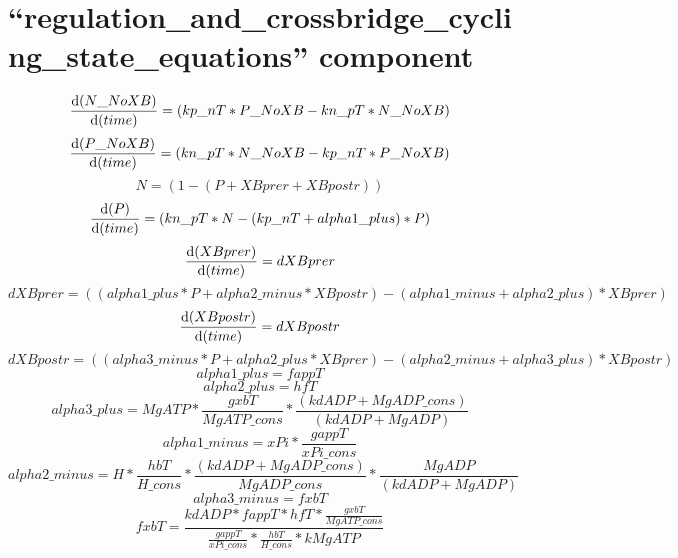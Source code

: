 \documentclass[10pt,landscape]{article}
\begin{document}
\section{``regulation\_and\_crossbridge\_cycling\_state\_equations'' component}
\textbf{}
\begin{displaymath}\frac{\mathrm{d}(N\_NoXB)}{\mathrm{d}(time)} = \left(kp\_nT \ast P\_NoXB-kn\_pT \ast N\_NoXB\right)
\end{displaymath}
\textbf{}
\begin{displaymath}\frac{\mathrm{d}(P\_NoXB)}{\mathrm{d}(time)} = \left(kn\_pT \ast N\_NoXB-kp\_nT \ast P\_NoXB\right)
\end{displaymath}
\textbf{}
\begin{displaymath}N = \left(1-\left(P+XBprer+XBpostr\right)\right)
\end{displaymath}
\textbf{}
\begin{displaymath}\frac{\mathrm{d}(P)}{\mathrm{d}(time)} = \left(kn\_pT \ast N-\left(kp\_nT+alpha1\_plus\right) \ast P\right)
\end{displaymath}
\textbf{}
\begin{displaymath}\frac{\mathrm{d}(XBprer)}{\mathrm{d}(time)} = dXBprer
\end{displaymath}
\textbf{}
\begin{displaymath}dXBprer = \left(\left(alpha1\_plus \ast P+alpha2\_minus \ast XBpostr\right)-\left(alpha1\_minus+alpha2\_plus\right) \ast XBprer\right)
\end{displaymath}
\textbf{}
\begin{displaymath}\frac{\mathrm{d}(XBpostr)}{\mathrm{d}(time)} = dXBpostr
\end{displaymath}
\textbf{}
\begin{displaymath}dXBpostr = \left(\left(alpha3\_minus \ast P+alpha2\_plus \ast XBprer\right)-\left(alpha2\_minus+alpha3\_plus\right) \ast XBpostr\right)
\end{displaymath}
\textbf{}
\begin{displaymath}alpha1\_plus = fappT
\end{displaymath}
\textbf{}
\begin{displaymath}alpha2\_plus = hfT
\end{displaymath}
\textbf{}
\begin{displaymath}alpha3\_plus = MgATP \ast \frac{gxbT}{MgATP\_cons} \ast \frac{\left(kdADP+MgADP\_cons\right)}{\left(kdADP+MgADP\right)}
\end{displaymath}
\textbf{}
\begin{displaymath}alpha1\_minus = xPi \ast \frac{gappT}{xPi\_cons}
\end{displaymath}
\textbf{}
\begin{displaymath}alpha2\_minus = H \ast \frac{hbT}{H\_cons} \ast \frac{\left(kdADP+MgADP\_cons\right)}{MgADP\_cons} \ast \frac{MgADP}{\left(kdADP+MgADP\right)}
\end{displaymath}
\textbf{}
\begin{displaymath}alpha3\_minus = fxbT
\end{displaymath}
\textbf{}
\begin{displaymath}fxbT = \frac{kdADP \ast fappT \ast hfT \ast \frac{gxbT}{MgATP\_cons}}{\frac{gappT}{xPi\_cons} \ast \frac{hbT}{H\_cons} \ast kMgATP}
\end{displaymath}
\end{document}
